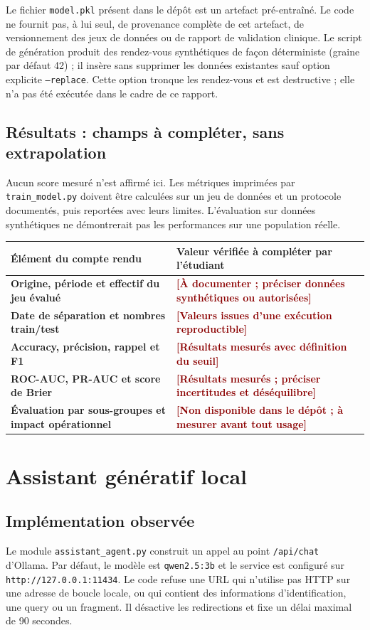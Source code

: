 \documentclass[11pt,a4paper]{report}
\newcommand{\code}[1]{\texttt{#1}}
\newcommand{\placeholder}[1]{\textcolor{darkred}{\textbf{[#1]}}}
\begin{document}
Le fichier \code{model.pkl} présent dans le dépôt est un artefact pré-entraîné.
Le code ne fournit pas, à lui seul, de provenance complète de cet artefact,
de versionnement des jeux de données ou de rapport de validation clinique.
Le script de génération produit des rendez-vous synthétiques de façon
déterministe (graine par défaut 42) ; il insère sans supprimer les données
existantes sauf option explicite \code{--replace}. Cette option tronque les
rendez-vous et est destructive ; elle n'a pas été exécutée dans le cadre de
ce rapport.

\section{Résultats : champs à compléter, sans extrapolation}
Aucun score mesuré n'est affirmé ici. Les métriques imprimées par
\code{train\_model.py} doivent être calculées sur un jeu de données et un
protocole documentés, puis reportées avec leurs limites. L'évaluation sur
données synthétiques ne démontrerait pas les performances sur une population
réelle.

\begin{tabularx}{\textwidth}{>{\bfseries}p{3.1cm}X}
\toprule
Élément du compte rendu & Valeur vérifiée à compléter par l'étudiant\\
\midrule
Origine, période et effectif du jeu évalué &
\placeholder{À documenter ; préciser données synthétiques ou autorisées}\\
Date de séparation et nombres train/test &
\placeholder{Valeurs issues d'une exécution reproductible}\\
Accuracy, précision, rappel et F1 &
\placeholder{Résultats mesurés avec définition du seuil}\\
ROC-AUC, PR-AUC et score de Brier &
\placeholder{Résultats mesurés ; préciser incertitudes et déséquilibre}\\
Évaluation par sous-groupes et impact opérationnel &
\placeholder{Non disponible dans le dépôt ; à mesurer avant tout usage}\\
\bottomrule
\end{tabularx}

\chapter{Assistant génératif local}
\section{Implémentation observée}
Le module \code{assistant\_agent.py} construit un appel au point
\code{/api/chat} d'Ollama. Par défaut, le modèle est \code{qwen2.5:3b} et le
service est configuré sur \code{http://127.0.0.1:11434}. Le code refuse une
URL qui n'utilise pas HTTP sur une adresse de boucle locale, ou qui contient
des informations d'identification, une query ou un fragment. Il désactive les
redirections et fixe un délai maximal de 90 secondes.
\end{document}
